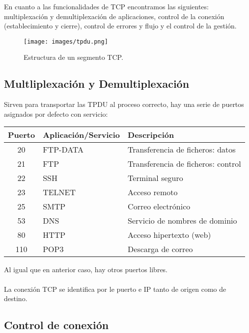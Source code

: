 \documentclass[a4paper,12pt]{article}
\begin{document}
En cuanto a las funcionalidades de TCP encontramos las siguientes: multiplexación y demultiplexación de aplicaciones, control de la conexión (establecimiento y cierre), control de errores y flujo y el control de la gestión.

\begin{figure}[H]
    \centering
    \texttt{[image: images/tpdu.png]}
    \caption{Estructura de un segmento TCP.}
    \label{fig:tcp}
\end{figure}

\subsection{Multliplexación y Demultiplexación}

Sirven para transportar las TPDU al proceso correcto, hay una serie de puertos asignados por defecto con servicio:
\begin{table}[H]
    \centering
    \begin{tabular}{|c|p{5cm}|p{5cm}|}
    \hline
    \textbf{Puerto} & \textbf{Aplicación/Servicio} & \textbf{Descripción} \\ \hline
    20 & FTP-DATA & Transferencia de ficheros: datos \\ \hline
    21 & FTP & Transferencia de ficheros: control \\ \hline
    22 & SSH & Terminal seguro \\ \hline
    23 & TELNET & Acceso remoto \\ \hline
    25 & SMTP & Correo electrónico \\ \hline
    53 & DNS & Servicio de nombres de dominio \\ \hline
    80 & HTTP & Acceso hipertexto (web) \\ \hline
    110 & POP3 & Descarga de correo \\ \hline
    \end{tabular}
\end{table}



Al igual que en anterior caso, hay otros puertos libres.\\\\
La conexión TCP se identifica por le puerto e IP tanto de origen como de destino.


\subsection{Control de conexión}
\end{document}
